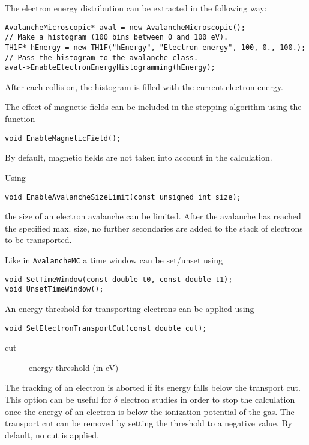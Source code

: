 The electron energy distribution can be extracted in the following way:
\begin{lstlisting}
AvalancheMicroscopic* aval = new AvalancheMicroscopic();
// Make a histogram (100 bins between 0 and 100 eV).
TH1F* hEnergy = new TH1F("hEnergy", "Electron energy", 100, 0., 100.);
// Pass the histogram to the avalanche class.
aval->EnableElectronEnergyHistogramming(hEnergy);
\end{lstlisting} 
After each collision, 
the histogram is filled with the current electron energy. 

The effect of magnetic fields can be included 
in the stepping algorithm using the function
\begin{lstlisting}
void EnableMagneticField();
\end{lstlisting}
By default, magnetic fields are not taken into account in the calculation.

Using 
\begin{lstlisting}
void EnableAvalancheSizeLimit(const unsigned int size);
\end{lstlisting}
the size of an electron avalanche can be limited. 
After the avalanche has reached the specified max. size, 
no further secondaries are added to the stack of electrons to be transported.  

Like in \texttt{AvalancheMC} a time window can be set/unset using
\begin{lstlisting}
void SetTimeWindow(const double t0, const double t1);
void UnsetTimeWindow();
\end{lstlisting}

An energy threshold for transporting electrons can be applied using 
\begin{lstlisting}
void SetElectronTransportCut(const double cut);
\end{lstlisting}
\begin{description}
  \item[cut] energy threshold (in eV)
\end{description}
The tracking of an electron is aborted if its energy falls below the 
transport cut. This option can be useful for \(\delta\) electron studies in 
order to stop the calculation once the energy of an electron 
is below the ionization potential of the gas. 
The transport cut can be removed by setting the threshold to a negative value.
By default, no cut is applied.

